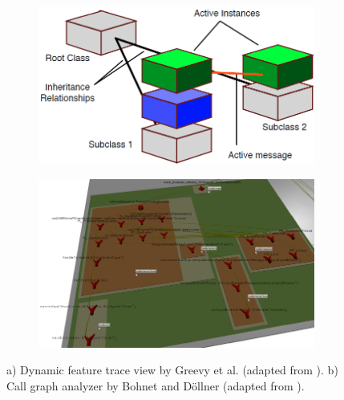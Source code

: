 \begin{figure}[tb]
	\centering
	
	\begin{subfigure}[b]{0.45\textwidth}
		\centering
        \includegraphics[width=\textwidth]{../images/06-Greevy-3D}
        \caption[Dynamic Feature Trace view by Greevy et al.]{}
		\label{fig:3DGreevy}
	\end{subfigure}
	\quad
	\begin{subfigure}[b]{0.45\textwidth}
		\centering
		\includegraphics[width=\textwidth]{../images/06-Bohnet-3D}
		\caption[Call Graph Analyzer by Bohnet and Döllner]{}
		\label{fig:3DBohnet}
	\end{subfigure}
	
	\caption[Three-Dimensional Information Presentations]{
		a) Dynamic feature trace view by Greevy et al. (adapted from \cite{greevy_visualizing_2006}).
		b) Call graph analyzer by Bohnet and Döllner (adapted from \cite{bohnet_visual_2006}).
	}
\end{figure}

